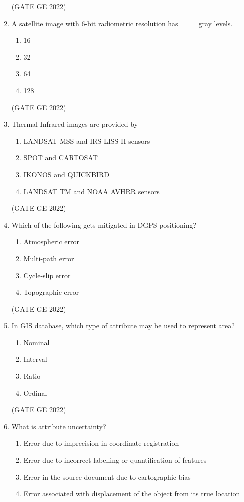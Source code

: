 \documentclass[a4paper, 11pt]{article}
\begin{document}
\begin{enumerate}
\hfill (GATE GE 2022)

\item A satellite image with 6-bit radiometric resolution has \_\_\_ gray levels.
\begin{enumerate}
    \item 16
    \item 32
    \item 64
    \item 128
\end{enumerate}

\hfill (GATE GE 2022)

\item Thermal Infrared images are provided by
\begin{enumerate}
    \item LANDSAT MSS and IRS LISS-II sensors
    \item SPOT and CARTOSAT
    \item IKONOS and QUICKBIRD
    \item LANDSAT TM and NOAA AVHRR sensors
\end{enumerate}

\hfill (GATE GE 2022)

\item Which of the following gets mitigated in DGPS positioning?
\begin{enumerate}
    \item Atmospheric error
    \item Multi-path error
    \item Cycle-slip error
    \item Topographic error
\end{enumerate}

\hfill (GATE GE 2022)

\item In GIS database, which type of attribute may be used to represent area?
\begin{enumerate}
    \item Nominal
    \item Interval
    \item Ratio
    \item Ordinal
\end{enumerate}

\hfill (GATE GE 2022)

\item What is attribute uncertainty?
\begin{enumerate}
    \item Error due to imprecision in coordinate registration
    \item Error due to incorrect labelling or quantification of features
    \item Error in the source document due to cartographic bias
    \item Error associated with displacement of the object from its true location
\end{enumerate}


\end{enumerate}
\end{document}
